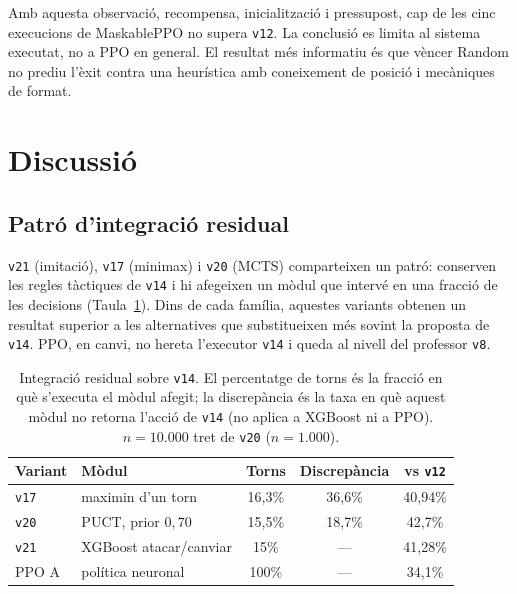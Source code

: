 Amb aquesta observació, recompensa, inicialització i pressupost, cap de les cinc execucions de MaskablePPO no supera \texttt{v12}. La conclusió es limita al sistema executat, no a PPO en general. El resultat més informatiu és que vèncer Random no prediu l'èxit contra una heurística amb coneixement de posició i mecàniques de format.

\FloatBarrier
\section{Discussió}
\label{sec:res_disc}

\subsection{Patró d'integració residual}

\texttt{v21} (imitació), \texttt{v17} (minimax) i \texttt{v20} (MCTS) comparteixen un patró: conserven les regles tàctiques de \texttt{v14} i hi afegeixen un mòdul que intervé en una fracció de les decisions (Taula~\ref{tab:residual_integration}). Dins de cada família, aquestes variants obtenen un resultat superior a les alternatives que substitueixen més sovint la proposta de \texttt{v14}. PPO, en canvi, no hereta l'executor \texttt{v14} i queda al nivell del professor \texttt{v8}.

\begin{table}[htbp]
    \centering
    \caption{Integració residual sobre \texttt{v14}. El percentatge de torns és la fracció en què s'executa el mòdul afegit; la discrepància és la taxa en què aquest mòdul no retorna l'acció de \texttt{v14} (no aplica a XGBoost ni a PPO). $n=10.000$ tret de \texttt{v20} ($n=1.000$).}
    \label{tab:residual_integration}
    \small
    \renewcommand{\arraystretch}{1.2}
    \begin{tabularx}{\textwidth}{lXccc}
        \toprule
        \textbf{Variant} & \textbf{Mòdul} & \textbf{Torns} & \textbf{Discrepància} & \textbf{vs \texttt{v12}} \\
        \midrule
        \texttt{v17} & maximin d'un torn & 16,3\% & 36,6\% & 40,94\% \\
        \arrayrulecolor{gray!30}\hline\arrayrulecolor{black}
        \texttt{v20} & PUCT, prior $0{,}70$ & 15,5\% & 18,7\% & 42,7\% \\
        \arrayrulecolor{gray!30}\hline\arrayrulecolor{black}
        \texttt{v21} & XGBoost atacar/canviar & 15\% & --- & 41,28\% \\
        \arrayrulecolor{gray!30}\hline\arrayrulecolor{black}
        PPO A & política neuronal & 100\% & --- & 34,1\% \\
        \bottomrule
    \end{tabularx}
\end{table}


